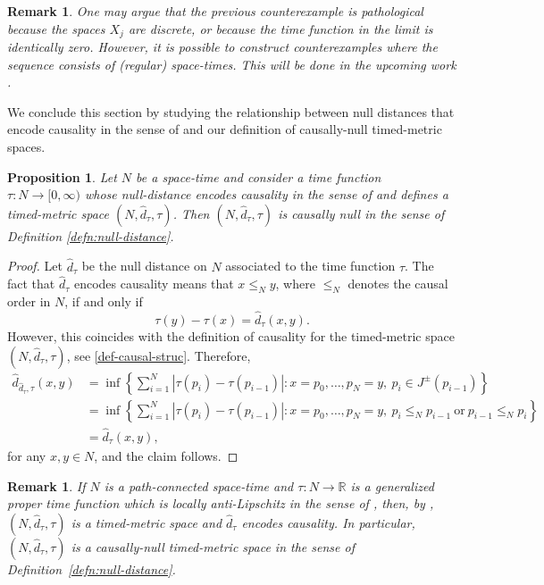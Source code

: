 \documentclass[a4paper,12pt,reqno]{amsart}
\theoremstyle{plain}
\newtheorem{prop}[thm]{Proposition}
\newtheorem{rmrk}[thm]{Remark}
\begin{document}
\begin{rmrk}
One may argue that the previous counterexample is pathological because the spaces $X_j$ are discrete, or because the time function in the limit is identically zero. However, it is possible to construct counterexamples where the sequence consists of (regular) space-times. This will be done in the upcoming work \cite{prados-zoghlami}.
\end{rmrk}



We conclude this section by studying the relationship between 
null distances that encode causality in the sense of \cite{SakSor-Null} and our definition of causally-null timed-metric spaces.  



\begin{prop}\label{prop:causal}
Let $N$ be a space-time and consider a time function $\tau\colon N\to [0,\infty)$ whose null-distance encodes causality in the sense of \cite{SakSor-Null} and defines a timed-metric space $(N, \hat d_{\tau},\tau)$. Then $(N, \hat d_{\tau},\tau)$ is causally null in the sense of Definition \ref{defn:null-distance}.
\end{prop}


\begin{proof}
Let $\hat{d}_{\tau}$ be the null distance on $N$ associated to the time function $\tau$. The fact that $\hat{d}_{\tau}$ encodes causality means that $x\leq_N y$, where $\leq_N$ denotes the causal order in $N$, if and only if 
\[
\tau(y)-\tau(x) = \hat{d}_{\tau}(x,y).
\] However, this 
coincides with the definition of causality
for the timed-metric space $(N,\hat{d}_{\tau},\tau)$, see \eqref{def-causal-struc}. Therefore,
\begin{align*}
\hat{d}_{\hat{d}_{\tau},\tau}(x,y) &= \inf\left\{
\sum_{i=1}^{N} |\tau(p_i)-\tau(p_{i-1})| : x = p_0, \dots, p_{N}=y,\ p_{i}\in J^\pm(p_{i-1})
\right\}\\
&= \inf\left\{
\sum_{i=1}^{N} |\tau(p_i)-\tau(p_{i-1})| : x = p_0, \dots, p_{N}=y,\ p_{i}\leq_N p_{i-1}\ \text{or}\ p_{i-1}\leq_N p_i
\right\}\\
&= \hat{d}_{\tau}(x,y),
\end{align*}
for any $x,y\in N$, and the claim follows.
\end{proof}

\begin{rmrk}
If $N$ is a path-connected space-time and 
$\tau\colon N \to \mathbb R$ is a generalized proper time function which is locally anti-Lipschitz in the sense of \cite{chrusciel-grant-minguzzi}, then, 
by \cite{SakSor-Null}, $(N, \hat d_{\tau}, \tau)$ is a timed-metric space and $\hat{d}_{\tau}$ encodes causality. In particular, $(N, \hat d_{\tau}, \tau)$ is a causally-null timed-metric space in the sense of Definition~\ref{defn:null-distance}. 
\end{rmrk}
\end{document}
